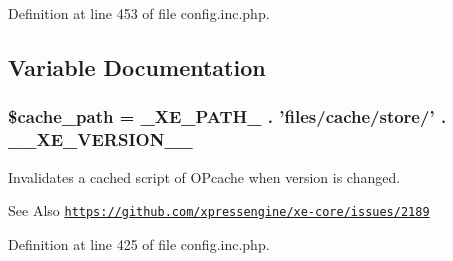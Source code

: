 Definition at line 453 of file config.\-inc.\-php.



\subsection{Variable Documentation}
\hypertarget{config_8inc_8php_ad2f8e7b06c1a881a5b9bd30d4b618356}{
\subsubsection[{\$cache\-\_\-path}]{\setlength{\rightskip}{0pt plus 5cm}\$cache\-\_\-path = {\bf \-\_\-\-X\-E\-\_\-\-P\-A\-T\-H\-\_\-} . 'files/cache/store/' . {\bf \-\_\-\-\_\-\-X\-E\-\_\-\-V\-E\-R\-S\-I\-O\-N\-\_\-\-\_\-}}}\label{config_8inc_8php_ad2f8e7b06c1a881a5b9bd30d4b618356}
Invalidates a cached script of O\-Pcache when version is changed. \begin{DoxySeeAlso}{See Also}
\href{https://github.com/xpressengine/xe-core/issues/2189}{\tt https\-://github.\-com/xpressengine/xe-\/core/issues/2189} 
\end{DoxySeeAlso}


Definition at line 425 of file config.\-inc.\-php.

